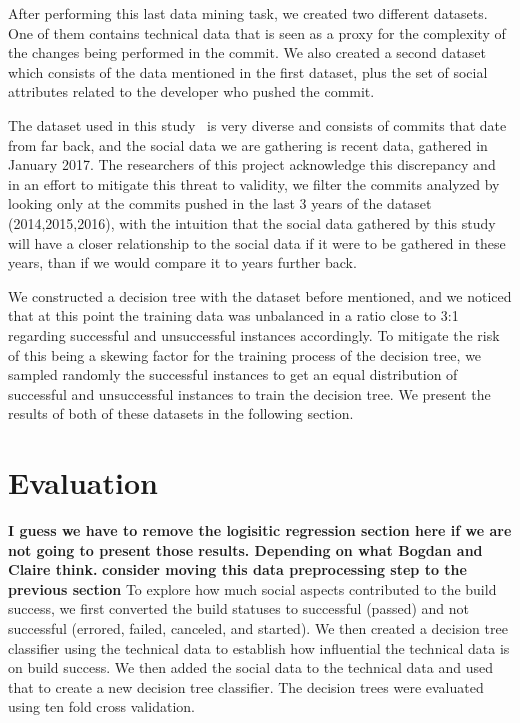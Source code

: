 \documentclass[10pt, conference]{IEEEtran}
\newcommand{\todo}[1]
  {{\scriptsize \textbf{\color{red} {#1}}}}
\begin{document}
After performing this last data mining task, we created two different datasets. 
One of them contains technical data that is seen as a proxy for the complexity 
of the changes being performed in the commit. We also created a second dataset 
which consists of the data mentioned in the first dataset, plus the set of 
social attributes related to the developer who pushed the commit. 

The dataset used in this study~\cite{msr17challenge} is very diverse 
and consists of commits that date from far back, and the social data we are 
gathering is recent data, gathered in January 2017. The researchers of this 
project acknowledge this discrepancy and in an effort to mitigate this threat to 
validity, we filter the commits analyzed by looking only at the commits pushed 
in the last 3 years of the dataset (2014,2015,2016), with the intuition that the 
social data gathered by this study will have a closer relationship to the social 
data if it were to be gathered in these years, than if we would compare it to 
years further back.

We constructed a decision tree with the dataset before mentioned, and we noticed that at this point the training data was unbalanced in a ratio close to 3:1 regarding successful and unsuccessful instances accordingly. To mitigate the risk of this being a skewing factor for the training process of the decision tree, we sampled randomly the successful instances to get an equal distribution of 
successful and unsuccessful instances to train the decision tree. We present the results of both of these datasets in the following section.

\section{Evaluation}
\todo{I guess we have to remove the logisitic regression section here if we are not going to present those results. Depending on what Bogdan and Claire think.}
\todo{consider moving this data preprocessing step to the previous section}
To explore how much social aspects contributed to the build success, we first
converted the build statuses to successful (passed) and not successful (errored,
failed, canceled, and started).  We then created a decision tree classifier
using the technical data to establish how influential the technical data is on 
build success.  We then added the social data to the technical data and used
that to create a new decision tree classifier.  The decision trees were
evaluated using ten fold cross validation.
\end{document}
